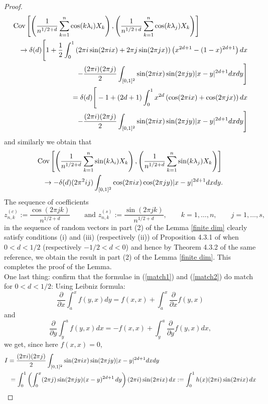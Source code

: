 \documentclass[12pt]{article}
\begin{document}
\begin{proof}
\begin{eqnarray}\label{match2}\lefteqn{
    \textrm{Cov}\left[\left(\frac{1} {n^{1/2+d}}\sum_{k=1}^n\cos(k\lambda_{i})X_k\right),\left(\frac{1}{n^{1/2+d}}\sum_{k=1}^n\cos(k\lambda_{j})X_k\right)\right]}\\
&&
\to\delta(d)\Bigg[1+\frac{1}{2}\int_0^1\left(2\pi i\sin(2\pi ix)+2\pi j\sin(2\pi jx)\right)\left(x^{2d+1}-(1-x)^{2d+1}\right)dx\nonumber\\
&&-\frac{(2\pi i)(2\pi j)}{2}\int_{[0,1]^2}\sin(2\pi ix)\sin(2\pi jy)\vert x- y\vert^{2d+1}dxdy\Bigg]\nonumber\\
&&=\delta(d)\Bigg[-1+(2d+1)\int_0^1x^{2d}\left(\cos(2\pi ix)+\cos(2\pi jx)\right)dx\nonumber\\
&&-\frac{(2\pi i)(2\pi j)}{2}\int_{[0,1]^2}\sin(2\pi ix)\sin(2\pi jy)\vert x- y\vert^{2d+1}dxdy\Bigg]
\end{eqnarray}
and similarly we obtain that
\begin{eqnarray*}\lefteqn{
    \textrm{Cov}\left[\left(\frac{1} {n^{1/2+d}}\sum_{k=1}^n\sin(k\lambda_{i})X_k\right),\left(\frac{1}{n^{1/2+d}}\sum_{k=1}^n\sin(k\lambda_{j})X_k\right)\right]}\\
&&\to-\delta(d)(2\pi^2 ij)\int_{[0,1]^2}\cos(2\pi ix)\cos(2\pi jy)\vert x- y\vert^{2d+1}dxdy.
\end{eqnarray*}
The sequence of coefficients 
$$
z^{(c)}_{n,k}:=\frac{\cos(2\pi jk)}{n^{1/2+d}}\qquad\textrm{and }z^{(s)}_{n,k}:=\frac{\sin(2\pi jk)}{n^{1/2+d}},\qquad k=1,\ldots,n,\qquad j=1,\ldots,s,
$$
in the sequence of random vectors in part (2) of the Lemma \ref{finite dim} clearly 
satisfy conditions (i) and (iii) (respectively (ii)) of Proposition 4.3.1 of  \cite{MR2977317} when $0<d<1/2$ (respectively $-1/2<d<0$) and hence by Theorem 4.3.2 of the same reference, we obtain the result in part (2) of the Lemma \ref{finite dim}. This completes the proof of the Lemma.\\ 
\iffalse
One last thing: confirm that the formulae in (\ref{match1}) and (\ref{match2}) do match for $0<d<1/2$: Using Leibniz formula:
$$
\frac{\partial}{\partial x}\int_a^xf(y,x)dy=f(x,x)+\int_a^x\frac{\partial}{\partial x}f(y,x)
$$
and
$$
\frac{\partial}{\partial y
}\int_y^af(y,x)dx=-f(x,x)+\int_y^a\frac{\partial}{\partial y}f(y,x)dx,
$$
we get, since here $f(x,x)=0$,
\begin{eqnarray*}\lefteqn{
I= \frac{(2\pi i)(2\pi j)}{2} \int_{[0,1]^2}
\sin(2\pi i x)\sin(2\pi j y)\vert x-y\vert^{2d+1}dxdy}\\
&&=\int_0^1 \left(\int_0^x (2\pi j)\sin(2\pi j y)(x-y)^{2d+1}\,dy\right)(2\pi i)\sin(2\pi ix)\,dx:=\int_0^1h(x)(2\pi i)\sin(2\pi ix)\,dx\\

\end{eqnarray*}
\end{proof}
\end{document}
